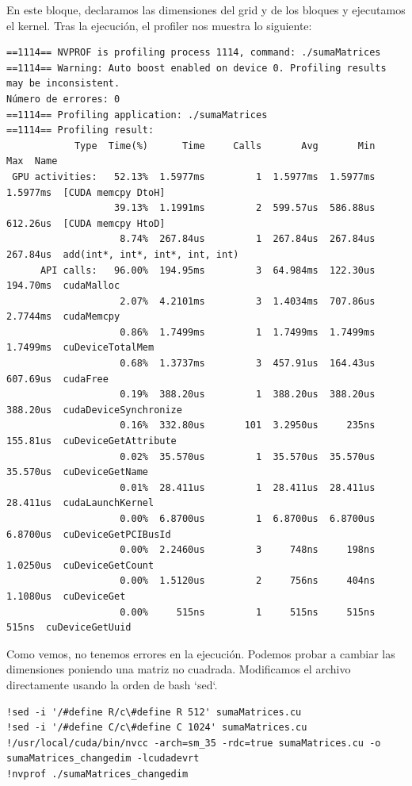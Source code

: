 \documentclass[11pt]{article}
\theoremstyle{plain}
\begin{document}
En este bloque, declaramos las dimensiones del grid y de los bloques y ejecutamos el kernel. Tras la ejecución, el profiler nos muestra lo siguiente:

\begin{verbatim}
==1114== NVPROF is profiling process 1114, command: ./sumaMatrices
==1114== Warning: Auto boost enabled on device 0. Profiling results may be inconsistent.
Número de errores: 0
==1114== Profiling application: ./sumaMatrices
==1114== Profiling result:
            Type  Time(%)      Time     Calls       Avg       Min       Max  Name
 GPU activities:   52.13%  1.5977ms         1  1.5977ms  1.5977ms  1.5977ms  [CUDA memcpy DtoH]
                   39.13%  1.1991ms         2  599.57us  586.88us  612.26us  [CUDA memcpy HtoD]
                    8.74%  267.84us         1  267.84us  267.84us  267.84us  add(int*, int*, int*, int, int)
      API calls:   96.00%  194.95ms         3  64.984ms  122.30us  194.70ms  cudaMalloc
                    2.07%  4.2101ms         3  1.4034ms  707.86us  2.7744ms  cudaMemcpy
                    0.86%  1.7499ms         1  1.7499ms  1.7499ms  1.7499ms  cuDeviceTotalMem
                    0.68%  1.3737ms         3  457.91us  164.43us  607.69us  cudaFree
                    0.19%  388.20us         1  388.20us  388.20us  388.20us  cudaDeviceSynchronize
                    0.16%  332.80us       101  3.2950us     235ns  155.81us  cuDeviceGetAttribute
                    0.02%  35.570us         1  35.570us  35.570us  35.570us  cuDeviceGetName
                    0.01%  28.411us         1  28.411us  28.411us  28.411us  cudaLaunchKernel
                    0.00%  6.8700us         1  6.8700us  6.8700us  6.8700us  cuDeviceGetPCIBusId
                    0.00%  2.2460us         3     748ns     198ns  1.0250us  cuDeviceGetCount
                    0.00%  1.5120us         2     756ns     404ns  1.1080us  cuDeviceGet
                    0.00%     515ns         1     515ns     515ns     515ns  cuDeviceGetUuid
\end{verbatim}


Como vemos, no tenemos errores en la ejecución. Podemos probar a cambiar las dimensiones poniendo una matriz no cuadrada. Modificamos el archivo directamente usando la orden de bash `sed`.

\begin{verbatim}
!sed -i '/#define R/c\#define R 512' sumaMatrices.cu
!sed -i '/#define C/c\#define C 1024' sumaMatrices.cu
!/usr/local/cuda/bin/nvcc -arch=sm_35 -rdc=true sumaMatrices.cu -o sumaMatrices_changedim -lcudadevrt
!nvprof ./sumaMatrices_changedim
\end{verbatim}
\end{document}
